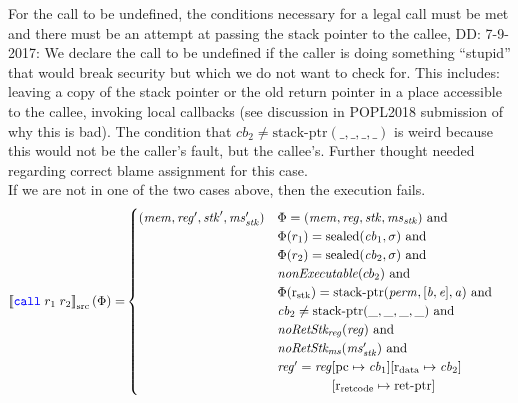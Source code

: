 \documentclass[a4paper]{article}
\newcommand\dominique[1]{{\color{purple} \sf \footnotesize {DD: #1}}\\}
\newcommand{\sem}[1]{\left\llbracket #1 \right\rrbracket}
\newcommand{\ssem}[2][\Phi]{\sem{#2}_{\mathrm{src}}(#1)}
\newcommand{\sourcecolor}{\color{blue}}
\newcommand{\src}[1]{{\sourcecolor #1}}
\newcommand{\zinstr}[1]{\texttt{#1}}
\newcommand{\twoinstr}[3]{
  \ifthenelse{\equal{#2#3}{}}
  {\zinstr{#1}}
  {\zinstr{#1} \; #2 \; #3}
}
\newcommand{\scall}[2]{\twoinstr{\src{call}}{#1}{#2}}
\newcommand{\update}[2]{[#1 \mapsto #2]}
\newcommand{\shareddom}[1]{\mathrm{#1}}
\newcommand{\perm}{\var{perm}}
\newcommand{\stkptr}[1]{\mathrm{stack\text{-}ptr}(#1)}
\newcommand{\retptr}{\mathrm{ret\text{-}ptr}}
\newcommand{\sealed}[1]{\shareddom{sealed}(#1)}
\newcommand{\var}[1]{\mathit{#1}}
\newcommand{\reg}{\var{reg}}
\newcommand{\mem}{\var{mem}}
\newcommand{\ms}{\var{ms}}
\newcommand{\stk}{\var{stk}}
\newcommand{\cb}{\var{cb}}
\newcommand{\baddr}{\var{b}}
\newcommand{\eaddr}{\var{e}}
\newcommand{\aaddr}{\var{a}}
\newcommand{\stdrng}{[\baddr,\eaddr]}
\newcommand{\pcreg}{\mathrm{pc}}
\newcommand{\rstk}{\mathrm{r}_\mathrm{stk}}
\newcommand{\rretc}{\mathrm{r}_\mathrm{ret code}}
\newcommand{\rdata}{\mathrm{r}_\mathrm{data}}
\newcommand{\plainfun}[2]{
  \ifthenelse{\equal{#2}{}}
  {\mathit{#1}}
  {\mathit{#1}(#2)}
}
\newcommand{\nonExec}[1]{\plainfun{nonExecutable}{#1}}
\newcommand{\noRetStkReg}[1]{\plainfun{noRetStk_{reg}}{#1}}
\newcommand{\noRetStkMs}[1]{\plainfun{noRetStk_{ms}}{#1}}
\begin{document}
For the call to be undefined, the conditions necessary for a legal call must be met and there must be an attempt at passing the stack pointer to the callee,
\dominique{7-9-2017: We declare the call to be undefined if the caller is doing something ``stupid'' that would break security but which we do not want to check for.  This includes: leaving a copy of the stack pointer or the old return pointer in a place accessible to the callee, invoking local callbacks (see discussion in POPL2018 submission of why this is bad).  The condition that $\cb_2 \neq \stkptr{\_,\_,\_,\_}$ is weird because this would not be the caller's fault, but the callee's.  Further thought needed regarding correct blame assignment for this case.}

If we are not in one of the two cases above, then the execution fails.
\begin{align*}
  \ssem{\scall{r_1}{r_2}} = & 
    \begin{cases}
      (\mem,\reg',\stk',\ms_\stk') & \arraycolsep=0pt
                                      \begin{array}[t]{l}
                                        \Phi = (\mem,\reg,\stk,\ms_\stk) \text{ and } \\
                                        \Phi(r_1) = \sealed{\cb_1,\sigma} \text{ and } \\
                                        \Phi(r_2) = \sealed{\cb_2,\sigma} \text{ and } \\
                                        \nonExec{cb_2} \text{ and } \\
                                        \Phi(\rstk) = \stkptr{\perm, \stdrng, \aaddr} \text{ and } \\
                                        \cb_2 \neq \stkptr{\_,\_,\_,\_} \text{ and } \\
                                        \noRetStkReg{\reg} \text{ and } \\
                                        \noRetStkMs{\ms_\stk'} \text{ and } \\
                                        \reg' = \reg
                                        \begin{array}[t]{l}
                                        \update{\pcreg}{\cb_1}\update{\rdata}{\cb_2}\\
                                        \update{\rretc}{\retptr}\\

\end{array}
\end{array}
\end{cases}
\end{align*}
\end{document}
